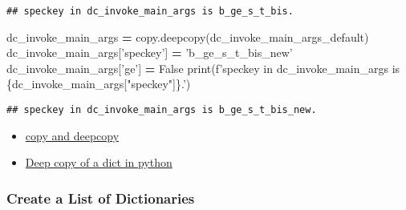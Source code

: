 \documentclass[
]{book}
\newenvironment{Shaded}{\begin{snugshade}}{\end{snugshade}}
\newcommand{\BuiltInTok}[1]{#1}
\newcommand{\NormalTok}[1]{#1}
\newcommand{\OperatorTok}[1]{\textcolor[rgb]{0.81,0.36,0.00}{\textbf{#1}}}
\newcommand{\SpecialCharTok}[1]{\textcolor[rgb]{0.00,0.00,0.00}{#1}}
\newcommand{\SpecialStringTok}[1]{\textcolor[rgb]{0.31,0.60,0.02}{#1}}
\newcommand{\StringTok}[1]{\textcolor[rgb]{0.31,0.60,0.02}{#1}}
\newcommand{\VariableTok}[1]{\textcolor[rgb]{0.00,0.00,0.00}{#1}}
\providecommand{\tightlist}{%
  \setlength{\itemsep}{0pt}\setlength{\parskip}{0pt}}
\begin{document}
\begin{verbatim}
## speckey in dc_invoke_main_args is b_ge_s_t_bis.
\end{verbatim}

\begin{Shaded}
\begin{Highlighting}[]
\NormalTok{dc_invoke_main_args }\OperatorTok{=}\NormalTok{ copy.deepcopy(dc_invoke_main_args_default)}
\NormalTok{dc_invoke_main_args[}\StringTok{'speckey'}\NormalTok{] }\OperatorTok{=} \StringTok{'b_ge_s_t_bis_new'}
\NormalTok{dc_invoke_main_args[}\StringTok{'ge'}\NormalTok{] }\OperatorTok{=} \VariableTok{False}
\BuiltInTok{print}\NormalTok{(}\SpecialStringTok{f'speckey in dc_invoke_main_args is }\SpecialCharTok{\{}\NormalTok{dc_invoke_main_args[}\StringTok{"speckey"}\NormalTok{]}\SpecialCharTok{\}}\SpecialStringTok{.'}\NormalTok{)}
\end{Highlighting}
\end{Shaded}

\begin{verbatim}
## speckey in dc_invoke_main_args is b_ge_s_t_bis_new.
\end{verbatim}

\begin{itemize}
\tightlist
\item
  \href{https://docs.python.org/2/library/copy.html}{copy and deepcopy}
\item
  \href{https://stackoverflow.com/questions/5105517/deep-copy-of-a-dict-in-python}{Deep copy of a dict in python}
\end{itemize}

\hypertarget{create-a-list-of-dictionaries-1}{%
\subsubsection{Create a List of Dictionaries}\label{create-a-list-of-dictionaries-1}}
\end{document}

